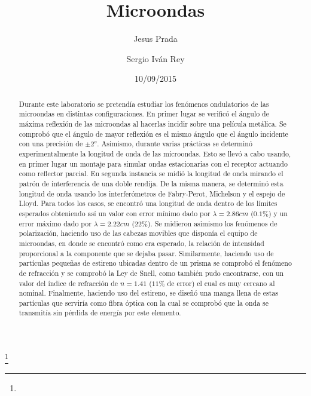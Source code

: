 \documentclass[%
 reprint,
 amsmath,amssymb,
 aps,
]{revtex4-1}
\begin{document}

\title{Microondas}%
\thanks{}%

\author{Jesus Prada}
\author{Sergio Iv\'an Rey}%
%

\date{10/09/2015}%

\begin{abstract}
Durante este laboratorio se pretendía estudiar los fenómenos ondulatorios de las microondas en distintas configuraciones. En primer lugar se verificó el ángulo de máxima reflexión de las microondas al hacerlas incidir sobre una película metálica. Se comprobó que el ángulo de mayor reflexión es el mismo ángulo que el ángulo incidente con una precisión de $\pm2^o$. Asimismo, durante varias prácticas se determinó experimentalmente la longitud de onda de las microondas. Esto se llevó a cabo usando, en primer lugar un montaje para simular ondas estacionarias con el receptor actuando como reflector parcial. En segunda instancia se midió la longitud de onda mirando el patrón de interferencia de una doble rendija. De la misma manera, se determinó esta longitud de onda usando los interferómetros de Fabry-Perot, Michelson y el espejo de Lloyd. Para todos los casos, se encontró una longitud de onda dentro de los límites esperados obteniendo así un valor con error mínimo dado por $\lambda = 2.86cm$ ($0.1\%$) y un error máximo dado por $\lambda= 2.22cm$ ($22\%$). Se midieron asimismo los fenómenos de polarización, haciendo uso de las cabezas movibles que disponía el equipo de microondas, en donde se encontró como era esperado, la relación de intensidad proporcional a la componente que se dejaba pasar. Similarmente, haciendo uso de partículas pequeñas de estireno ubicadas dentro de un prisma se comprobó el fenómeno de refracción y se comprobó la Ley de Snell, como también pudo encontrarse, con un valor del índice de refracción de $n = 1.41$ ($11\%$ de error) el cual es muy cercano al nominal. Finalmente, haciendo uso del estireno, se diseñó una manga llena de estas partículas que serviría como fibra óptica con la cual se comprobó que la onda se transmitía sin pérdida de energía por este elemento. \\
\end{abstract}
\end{document}
